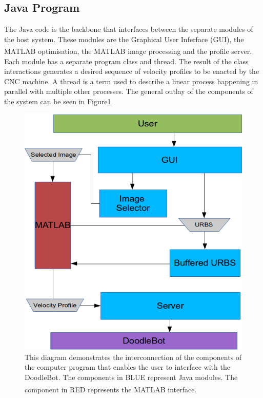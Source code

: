 \subsection{Java Program}
The Java code is the backbone that interfaces between the separate modules of the host system. These modules are the Graphical User Inferface (GUI), the MATLAB\textsuperscript{\textregistered} optimisation, the MATLAB\textsuperscript{\textregistered} image processing and the profile server. Each module has a separate program class and thread. The result of the class interactions generates a desired sequence of velocity profiles to be enacted by the CNC machine. A thread is a term used to describe a linear process happening in parallel with multiple other processes. The general outlay of the components of the system can be seen in Figure\ref{fig:javaOverview}


\begin{figure}[htbp]  
\includegraphics[width=\textwidth]{figures/implementation/humanMachineInterface/systemDiagram.png}
\caption[Human Machine Interface System Diagram]{This diagram demonstrates the interconnection of the components of the computer program that enables the user to interface with the DoodleBot. The components in BLUE represent Java modules. The component in RED represents the MATLAB\textsuperscript{\textregistered} interface.
\label{fig:javaOverview}}
\end{figure}

